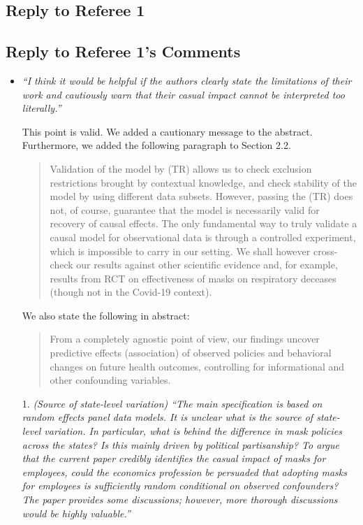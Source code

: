 \documentclass[11pt]{article}
\begin{document}
\newpage

\replytitle
\subsection*{Reply to Referee 1}

\changes
\subsection*{Reply to Referee 1's Comments}
\begin{itemize}

\item  \textit{``I think it would be helpful if the authors clearly state the limitations of their work and
cautiously warn that their casual impact cannot be interpreted too literally.''}
 
 This point is valid.  We added a cautionary message to the abstract. Furthermore,
 we added the following paragraph to Section 2.2. 
 \begin{quote}
 Validation of the model by (TR) allows us to check exclusion restrictions brought by contextual knowledge, and check stability of the model by using different data subsets. However, passing the (TR) does not, of course, guarantee that the model is necessarily valid for recovery of causal effects. The only fundamental way to truly validate a causal model for observational data is through a controlled experiment, which is impossible to carry in our setting. We shall however cross-check our results against other scientific evidence and, for example, results from RCT on effectiveness of masks on respiratory deceases (though not in the Covid-19 context).
 \end{quote}
 
 We also state the following in abstract:
 \begin{quote}
 From a completely agnostic point of view,
our findings uncover predictive effects (association) of observed policies and behavioral changes  on future health outcomes,
 controlling for informational and other confounding variables.
\end{quote}
  
\item[1.]   \textit{(Source of state-level variation) ``The main specification is based on random effects panel data
models. It is unclear what is the source of state-level variation. In particular, what is behind
the difference in mask policies across the states? Is this mainly driven by political partisanship?
To argue that the current paper credibly identifies the casual impact of masks for
employees, could the economics profession be persuaded that adopting masks for employees
is sufficiently random conditional on observed confounders? The paper provides some
discussions; however, more thorough discussions would be highly valuable.''}
  

\end{itemize}
\end{document}
